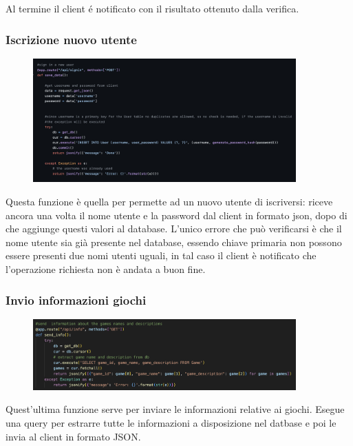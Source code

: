 \documentclass{article}
\begin{document}
Al termine il client é notificato con il risultato ottenuto dalla verifica.

\subsubsection{Iscrizione nuovo utente}
\begin{figure}[H]
    \centering
    \includegraphics[width=0.9\textwidth]{images/iscrizione_nuovo_utente.png}
\end{figure}

Questa funzione è quella per permette ad un nuovo utente di iscriversi: riceve ancora una volta il nome utente e la password dal client in formato json, dopo di che aggiunge questi valori al database.
L’unico errore che può verificarsi è che il nome utente sia già presente nel database, essendo chiave primaria non possono essere presenti due nomi utenti uguali, in tal caso il client è notificato che l’operazione richiesta non è andata a buon fine.

\subsubsection{Invio informazioni giochi}
\begin{figure}[H]
    \centering
    \includegraphics[width=0.9\textwidth]{images/game_info.png}
\end{figure}
Quest'ultima funzione serve per inviare le informazioni relative ai giochi.
Esegue una query per estrarre tutte le informazioni a disposizione nel datbase e poi le invia al client in formato JSON. 
\end{document}
